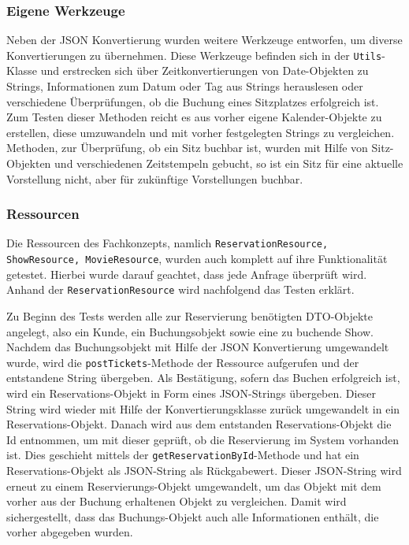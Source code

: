 \subsubsection{Eigene Werkzeuge}

Neben der \acs{JSON} Konvertierung wurden weitere Werkzeuge entworfen, um diverse Konvertierungen zu übernehmen.
Diese Werkzeuge befinden sich in der \texttt{Utils}-Klasse und erstrecken sich über Zeitkonvertierungen von Date-Objekten zu Strings, Informationen zum Datum oder Tag aus Strings herauslesen oder verschiedene Überprüfungen, ob die Buchung eines Sitzplatzes erfolgreich ist.
Zum Testen dieser Methoden reicht es aus vorher eigene Kalender-Objekte zu erstellen, diese umzuwandeln und mit vorher festgelegten Strings zu vergleichen.
Methoden, zur Überprüfung, ob ein Sitz buchbar ist, wurden mit Hilfe von Sitz-Objekten und verschiedenen Zeitstempeln gebucht, so ist ein Sitz für eine aktuelle Vorstellung nicht, aber für zukünftige Vorstellungen buchbar.

\subsubsection{Ressourcen}
Die Ressourcen des Fachkonzepts, namlich \texttt{ReservationResource, ShowResource, MovieResource}, wurden auch komplett auf ihre Funktionalität getestet.
Hierbei wurde darauf geachtet, dass jede Anfrage überprüft wird. Anhand der \texttt{ReservationResource} wird nachfolgend das Testen erklärt.

Zu Beginn des Tests werden alle zur Reservierung benötigten \acs{DTO}-Objekte angelegt, also ein Kunde, ein Buchungsobjekt sowie eine zu buchende Show.
Nachdem das Buchungsobjekt mit Hilfe der JSON Konvertierung umgewandelt wurde, wird die \texttt{postTickets}-Methode der Ressource aufgerufen und der entstandene String übergeben.
Als Bestätigung, sofern das Buchen erfolgreich ist, wird ein Reservations-Objekt in Form eines \acs{JSON}-Strings übergeben. Dieser String wird wieder mit Hilfe der Konvertierungsklasse zurück umgewandelt in ein Reservations-Objekt.
Danach wird aus dem entstanden Reservations-Objekt die Id entnommen, um mit dieser geprüft, ob die Reservierung im System vorhanden ist. Dies geschieht mittels der \texttt{getReservationById}-Methode und hat ein Reservations-Objekt als \acs{JSON}-String als Rückgabewert.
Dieser \acs{JSON}-String wird erneut zu einem Reservierungs-Objekt umgewandelt, um das Objekt mit dem vorher aus der Buchung erhaltenen Objekt zu vergleichen. Damit wird sichergestellt, dass das Buchungs-Objekt auch alle Informationen enthält, die vorher abgegeben wurden.

